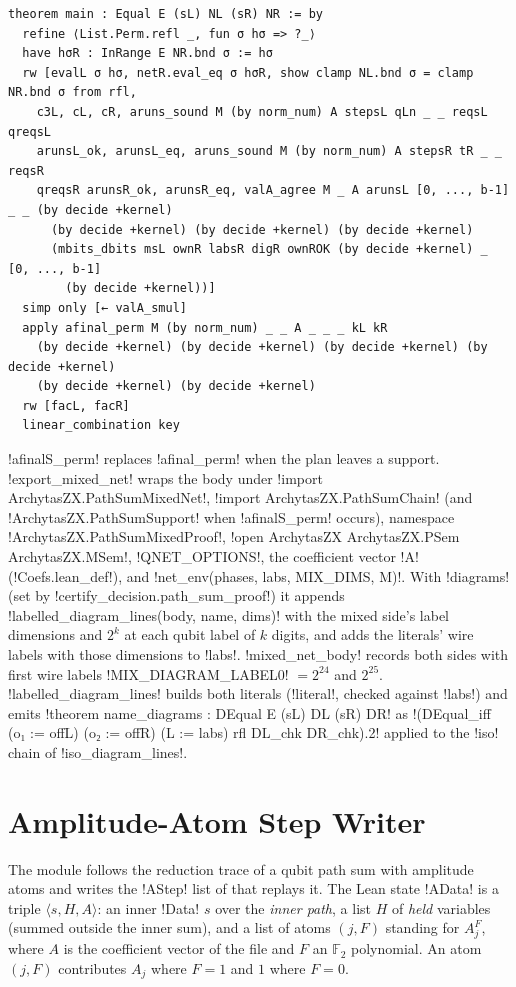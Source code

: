 {{{\begin{lstlisting}[style=lexlean]
theorem main : Equal E (sL) NL (sR) NR := by
  refine ⟨List.Perm.refl _, fun σ hσ => ?_⟩
  have hσR : InRange E NR.bnd σ := hσ
  rw [evalL σ hσ, netR.eval_eq σ hσR, show clamp NL.bnd σ = clamp NR.bnd σ from rfl,
    c3L, cL, cR, aruns_sound M (by norm_num) A stepsL qLn _ _ reqsL qreqsL
    arunsL_ok, arunsL_eq, aruns_sound M (by norm_num) A stepsR tR _ _ reqsR
    qreqsR arunsR_ok, arunsR_eq, valA_agree M _ A arunsL [0, ..., b-1] _ _ (by decide +kernel)
      (by decide +kernel) (by decide +kernel) (by decide +kernel)
      (mbits_dbits msL ownR labsR digR ownROK (by decide +kernel) _ [0, ..., b-1]
        (by decide +kernel))]
  simp only [← valA_smul]
  apply afinal_perm M (by norm_num) _ _ A _ _ _ kL kR
    (by decide +kernel) (by decide +kernel) (by decide +kernel) (by decide +kernel)
    (by decide +kernel) (by decide +kernel)
  rw [facL, facR]
  linear_combination key
\end{lstlisting}
\lexlean!afinalS_perm! replaces \lexlean!afinal_perm! when the plan leaves a support.
\lexpy!export_mixed_net! wraps the body under \lexlean!import ArchytasZX.PathSumMixedNet!,
\lexlean!import ArchytasZX.PathSumChain! (and \lexlean!ArchytasZX.PathSumSupport! when
\lexlean!afinalS_perm! occurs), namespace \lexlean!ArchytasZX.PathSumMixedProof!,
\lexlean!open ArchytasZX ArchytasZX.PSem ArchytasZX.MSem!, \lexpy!QNET_OPTIONS!, the coefficient
vector \lexlean!A! (\lexpy!Coefs.lean_def!), and \lexpy!net_env(phases, labs, MIX_DIMS, M)!.
With \py!diagrams! (set by \py!certify_decision.path_sum_proof!) it appends
\py!labelled_diagram_lines(body, name, dims)! with the mixed side's label dimensions and
$2^k$ at each qubit label of $k$ digits, and adds the literals' wire labels with those
dimensions to \lexlean!labs!. \py!mixed_net_body! records both sides with first wire labels
\py!MIX_DIAGRAM_LABEL0! $=2^{24}$ and $2^{25}$. \py!labelled_diagram_lines! builds both literals
(\py!literal!, checked against \lexlean!labs!) and emits
\lexlean!theorem name_diagrams : DEqual E (sL) DL (sR) DR! as
\lexlean!(DEqual_iff (o₁ := offL) (o₂ := offR) (L := labs) rfl DL_chk DR_chk).2! applied to the
\lexlean!iso! chain of \py!iso_diagram_lines!.

\section{Amplitude-Atom Step Writer}\label{sec:lean-export-amp}

The module  follows the reduction trace of a qubit path
sum with amplitude atoms and writes the \lexlean!AStep! list of
 that replays it. The Lean state \lexlean!AData! is a triple
$\langle s, H, A\rangle$: an inner \lexlean!Data! $s$ over the \emph{inner path}, a list $H$ of
\emph{held} variables (summed outside the inner sum), and a list of atoms $(j, F)$ standing for
$A_j^{F}$, where $A$ is the coefficient vector of the file and $F$ an $\mathbb{F}_2$
polynomial. An atom $(j,F)$ contributes $A_j$ where $F=1$ and $1$ where $F=0$.

}}}
